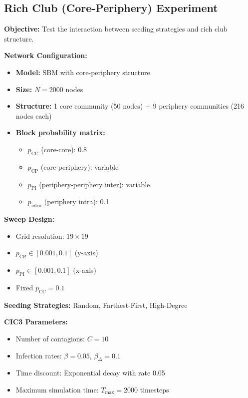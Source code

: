 \documentclass[sigconf]{acmart}
\begin{document}
\subsection{Rich Club (Core-Periphery) Experiment}
\label{app:richclub}

\textbf{Objective:} Test the interaction between seeding strategies and rich club structure.

\textbf{Network Configuration:}
\begin{itemize}
    \item \textbf{Model:} SBM with core-periphery structure
    \item \textbf{Size:} $N=2000$ nodes
    \item \textbf{Structure:} 1 core community (50 nodes) + 9 periphery communities (216 nodes each)
    \item \textbf{Block probability matrix:}
    \begin{itemize}
        \item $p_{\text{CC}}$ (core-core): 0.8
        \item $p_{\text{CP}}$ (core-periphery): variable
        \item $p_{\text{PI}}$ (periphery-periphery inter): variable
        \item $p_{\text{intra}}$ (periphery intra): 0.1
    \end{itemize}
\end{itemize}

\textbf{Sweep Design:}
\begin{itemize}
    \item Grid resolution: $19 \times 19$
    \item $p_{\text{CP}} \in [0.001, 0.1]$ (y-axis)
    \item $p_{\text{PI}} \in [0.001, 0.1]$ (x-axis)
    \item Fixed $p_{\text{CC}} = 0.1$
\end{itemize}

\textbf{Seeding Strategies:} Random, Farthest-First, High-Degree

\textbf{CIC3 Parameters:}
\begin{itemize}
    \item Number of contagions: $C=10$
    \item Infection rates: $\beta = 0.05$, $\beta_{\Delta} = 0.1$
    \item Time discount: Exponential decay with rate 0.05
    \item Maximum simulation time: $T_{\text{max}} = 2000$ timesteps
\end{itemize}
\end{document}
